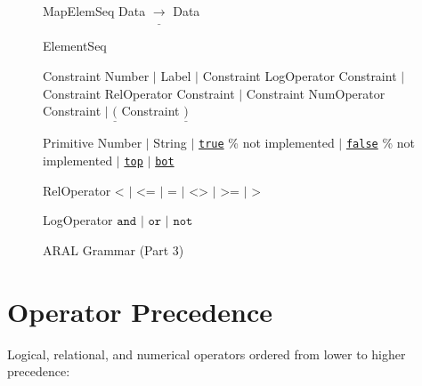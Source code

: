 {\begin{figure}[!ht]
\begin{GRAMMAR}
{MapElemSeq}     \>\>\>\>\>\garrow\> Data $\underline{\rightarrow}$ Data 

{ElementSeq}     \>\>\>\>\>\garrow\> 

{Constraint}     \>\>\>\>\>\garrow\> Number
                 \>\>\>\>\> \> $\mid$ Label
                 \>\>\>\>\> \> $\mid$ Constraint LogOperator Constraint
                 \>\>\>\>\> \> $\mid$ Constraint RelOperator Constraint
                 \>\>\>\>\> \> $\mid$ Constraint NumOperator Constraint 
                 \>\>\>\>\> \> $\mid$ $\underline{(}$ Constraint $\underline{)}$ 


{Primitive}      \>\>\>\>\>\garrow\> Number
                 \>\>\>\>\> \>$\mid$ String
                 \>\>\>\>\> \>$\mid$ \underline{\texttt{true}} \% not implemented
                 \>\>\>\>\> \>$\mid$ \underline{\texttt{false}} \% not implemented
                 \>\>\>\>\> \>$\mid$ \underline{\texttt{top}}
                 \>\>\>\>\> \>$\mid$ \underline{\texttt{bot}}

{RelOperator}   \>\>\>\>\>\garrow\> \underline{$\texttt{<}$} $\mid$ \underline{$\texttt{<=}$} $\mid$ \underline{$\texttt{=}$} $\mid$ \underline{$\texttt{<>}$} $\mid$ \underline{$\texttt{>=}$} $\mid$ \underline{$\texttt{>}$}

{LogOperator}   \>\>\>\>\>\garrow\> \underline{$\texttt{and}$} $\mid$ \underline{$\texttt{or}$} $\mid$ \underline{$\texttt{not}$}

\end{GRAMMAR}
\caption{ARAL Grammar (Part 3)}
\label{fig:araltwo}
\end{figure}
}


\section{Operator Precedence}

Logical, relational, and numerical operators ordered from lower to higher precedence:

